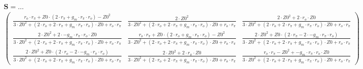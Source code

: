 \begin{multline}\mathbf{S}=\ldots\\\left(\begin{smallmatrix}
\frac{r_o\cdot r_{\pi}+Z0\cdot \left(2\cdot r_{\pi}+g_m\cdot
r_{\pi}\cdot r_o\right)-Z0^2}{3\cdot Z0^2+\left(2\cdot r_o+2\cdot
r_{\pi}+g_m\cdot r_{\pi}\cdot r_o\right)\cdot Z0+r_o\cdot r_{\pi}} &
\frac{2\cdot Z0^2}{3\cdot Z0^2+\left(2\cdot r_o+2\cdot
r_{\pi}+g_m\cdot r_{\pi}\cdot r_o\right)\cdot Z0+r_o\cdot r_{\pi}} &
\frac{2\cdot Z0^2+2\cdot r_o\cdot Z0}{3\cdot Z0^2+\left(2\cdot
r_o+2\cdot r_{\pi}+g_m\cdot r_{\pi}\cdot r_o\right)\cdot Z0+r_o\cdot
r_{\pi}} \\ \frac{2\cdot Z0^2+2\cdot -g_m\cdot r_{\pi}\cdot r_o\cdot
Z0}{3\cdot Z0^2+\left(2\cdot r_o+2\cdot r_{\pi}+g_m\cdot r_{\pi}\cdot
r_o\right)\cdot Z0+r_o\cdot r_{\pi}} & \frac{r_o\cdot r_{\pi}+Z0\cdot
\left(2\cdot r_o+g_m\cdot r_{\pi}\cdot r_o\right)-Z0^2}{3\cdot
Z0^2+\left(2\cdot r_o+2\cdot r_{\pi}+g_m\cdot r_{\pi}\cdot
r_o\right)\cdot Z0+r_o\cdot r_{\pi}} & \frac{2\cdot Z0^2+Z0\cdot
\left(2\cdot r_{\pi}-2\cdot -g_m\cdot r_{\pi}\cdot r_o\right)}{3\cdot
Z0^2+\left(2\cdot r_o+2\cdot r_{\pi}+g_m\cdot r_{\pi}\cdot
r_o\right)\cdot Z0+r_o\cdot r_{\pi}} \\ \frac{2\cdot Z0^2+Z0\cdot
\left(2\cdot r_o-2\cdot -g_m\cdot r_{\pi}\cdot r_o\right)}{3\cdot
Z0^2+\left(2\cdot r_o+2\cdot r_{\pi}+g_m\cdot r_{\pi}\cdot
r_o\right)\cdot Z0+r_o\cdot r_{\pi}} & \frac{2\cdot Z0^2+2\cdot
r_{\pi}\cdot Z0}{3\cdot Z0^2+\left(2\cdot r_o+2\cdot r_{\pi}+g_m\cdot
r_{\pi}\cdot r_o\right)\cdot Z0+r_o\cdot r_{\pi}} & \frac{r_o\cdot
r_{\pi}-Z0^2+-g_m\cdot r_{\pi}\cdot r_o\cdot Z0}{3\cdot
Z0^2+\left(2\cdot r_o+2\cdot r_{\pi}+g_m\cdot r_{\pi}\cdot
r_o\right)\cdot Z0+r_o\cdot r_{\pi}}
\end{smallmatrix}\right)\end{multline}

